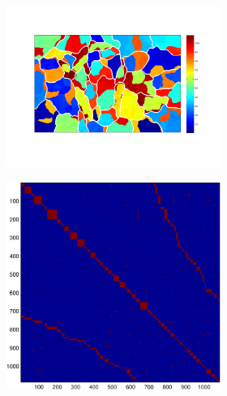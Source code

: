 \documentclass{article} %
\begin{document}
\begin{figure}
\begin{subfigure}[c]{\textwidth}
\begin{subfigure}[c]{0.195\textwidth}
			\label{fig:1_22_s_map}
		\end{subfigure}
		\begin{subfigure}[]{0.195\textwidth}
			\includegraphics[width = \textwidth]{./img/su1_22_s.pdf}
			\label{fig:1_22_s_su}
		\end{subfigure}
		\begin{subfigure}[c]{0.195\textwidth}
			\includegraphics[width = \textwidth]{./img/adj1_22_s.pdf}
			\label{fig1_22_s_adj}
		\end{subfigure}
	\end{subfigure}


\end{figure}
\end{document}
